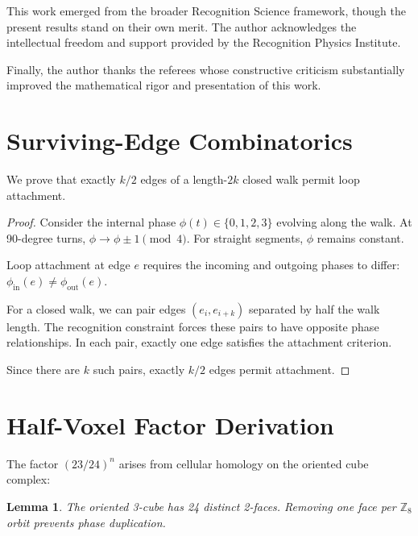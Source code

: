 \documentclass[11pt,a4paper]{article}
\newtheorem{lemma}[theorem]{Lemma}
\theoremstyle{definition}
\theoremstyle{remark}
\begin{document}
This work emerged from the broader Recognition Science framework, though the present results stand on their own merit. The author acknowledges the intellectual freedom and support provided by the Recognition Physics Institute. 

Finally, the author thanks the referees whose constructive criticism substantially improved the mathematical rigor and presentation of this work.

\appendix

\section{Surviving-Edge Combinatorics}
\label{app:edges}

We prove that exactly $k/2$ edges of a length-$2k$ closed walk permit loop attachment.

\begin{proof}
Consider the internal phase $\phi(t) \in \{0,1,2,3\}$ evolving along the walk. At 90-degree turns, $\phi \to \phi \pm 1 \pmod{4}$. For straight segments, $\phi$ remains constant.

Loop attachment at edge $e$ requires the incoming and outgoing phases to differ: $\phi_{\text{in}}(e) \neq \phi_{\text{out}}(e)$. 

For a closed walk, we can pair edges $(e_i, e_{i+k})$ separated by half the walk length. The recognition constraint forces these pairs to have opposite phase relationships. In each pair, exactly one edge satisfies the attachment criterion.

Since there are $k$ such pairs, exactly $k/2$ edges permit attachment.
\end{proof}

\section{Half-Voxel Factor Derivation}
\label{app:halfvoxel}

The factor $(23/24)^n$ arises from cellular homology on the oriented cube complex:

\begin{lemma}
The oriented 3-cube has 24 distinct 2-faces. Removing one face per $\mathbb{Z}_8$ orbit prevents phase duplication.
\end{lemma}
\end{document}
